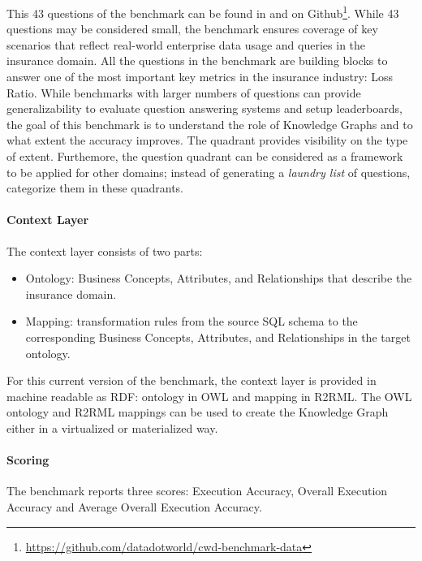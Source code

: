 \documentclass[11pt]{article}
\begin{document}
This 43 questions of the benchmark can be found in \cite{OurPreviousWork} and on 
 Github\footnote{\url{https://github.com/datadotworld/cwd-benchmark-data}}.
While 43 questions may be considered small, the benchmark ensures coverage of key scenarios that reflect real-world enterprise data usage and queries in the insurance domain. 
All the questions in the benchmark are building blocks to answer one of the most important key metrics in the insurance industry: Loss Ratio.
While benchmarks with larger numbers of questions can provide generalizability to evaluate question answering systems and setup leaderboards, the goal of this benchmark is to understand the role of Knowledge Graphs and to what extent the accuracy improves. 
The quadrant provides visibility on the type of extent. 
Furthemore, the question quadrant can be considered as a framework to be applied for other domains; instead of generating a \textit{laundry list} of questions, categorize them in these quadrants. 



\paragraph{Context Layer}
The context layer consists of two parts:
\begin{itemize}
    \item Ontology: Business Concepts, Attributes, and Relationships that describe the insurance domain. 
    \item Mapping: transformation rules from the source SQL schema to the corresponding Business Concepts, Attributes, and Relationships in the target ontology. 
\end{itemize}

For this current version of the benchmark, the context layer is provided in machine readable as RDF: ontology in OWL and mapping in R2RML.
The OWL ontology and R2RML mappings can be used to create the Knowledge Graph either in a virtualized or materialized way. 


\paragraph{Scoring}
The benchmark reports three scores: Execution Accuracy, Overall Execution Accuracy and Average Overall Execution Accuracy.
\end{document}
